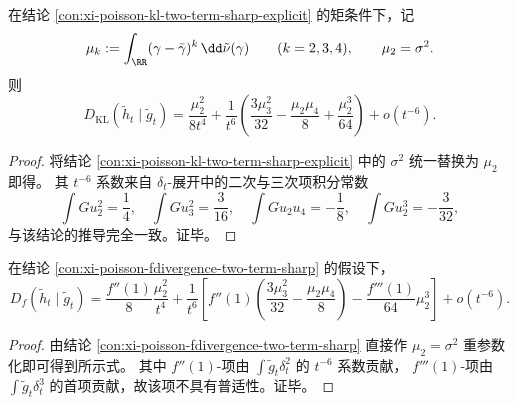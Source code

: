 \begin{conclusion}\label{con:xi-poisson-kl-second-correction-mu2-notation}
在结论 \ref{con:xi-poisson-kl-two-term-sharp-explicit} 的矩条件下，记
\[
\mu_k:=\int_{\RR}(\gamma-\bar\gamma)^k\,\dd\tilde\nu(\gamma)\qquad(k=2,3,4),\qquad \mu_2=\sigma^2.
\]
则
\[
D_{\mathrm{KL}}(\tilde h_t\mid \tilde g_t)
=\frac{\mu_2^2}{8t^4}
+\frac1{t^6}\left(\frac{3\mu_3^2}{32}-\frac{\mu_2\mu_4}{8}+\frac{\mu_2^3}{64}\right)
+o(t^{-6}).
\]
\end{conclusion}
\begin{proof}
将结论 \ref{con:xi-poisson-kl-two-term-sharp-explicit} 中的 \(\sigma^2\) 统一替换为 \(\mu_2\) 即得。
其 \(t^{-6}\) 系数来自 \(\delta_t\)-展开中的二次与三次项积分常数
\[
\int Gu_2^2=\frac14,\quad
\int Gu_3^2=\frac{3}{16},\quad
\int Gu_2u_4=-\frac18,\quad
\int Gu_2^3=-\frac{3}{32},
\]
与该结论的推导完全一致。证毕。
\end{proof}

\begin{conclusion}\label{con:xi-poisson-fdiv-second-correction-f3-term}
在结论 \ref{con:xi-poisson-fdivergence-two-term-sharp} 的假设下，
\[
D_f(\tilde h_t\mid\tilde g_t)
=\frac{f''(1)}{8}\frac{\mu_2^2}{t^4}
+\frac1{t^6}\left[
f''(1)\!\left(\frac{3\mu_3^2}{32}-\frac{\mu_2\mu_4}{8}\right)
-\frac{f'''(1)}{64}\mu_2^3
\right]
+o(t^{-6}).
\]
\end{conclusion}
\begin{proof}
由结论 \ref{con:xi-poisson-fdivergence-two-term-sharp} 直接作 \(\mu_2=\sigma^2\) 重参数化即可得到所示式。
其中 \(f''(1)\)-项由 \(\int \tilde g_t\delta_t^2\) 的 \(t^{-6}\) 系数贡献，
\(f'''(1)\)-项由 \(\int \tilde g_t\delta_t^3\) 的首项贡献，故该项不具有普适性。证毕。
\end{proof}

